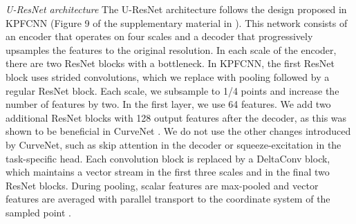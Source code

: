 \documentclass[acmtog, authorversion]{acmart}
\begin{document}
\emph{U-ResNet architecture} The U-ResNet architecture follows the design proposed in KPFCNN \cite{thomas2019KPConv} (Figure 9 of the supplementary material in \cite{thomas2019KPConv}). This network consists of an encoder that operates on four scales and a decoder that progressively upsamples the features to the original resolution. In each scale of the encoder, there are two ResNet blocks with a bottleneck. In KPFCNN, the first ResNet block uses strided convolutions, which we replace with pooling followed by a regular ResNet block. Each scale, we subsample to 1/4 points and increase the number of features by two. In the first layer, we use 64 features. We add two additional ResNet blocks with 128 output features after the decoder, as this was shown to be beneficial in CurveNet \cite{curvenet}. We do not use the other changes introduced by CurveNet, such as skip attention in the decoder or squeeze-excitation in the task-specific head. Each convolution block is replaced by a DeltaConv block, which maintains a vector stream in the first three scales and in the final two ResNet blocks. During pooling, scalar features are max-pooled and vector features are averaged with parallel transport to the coordinate system of the sampled point \cite{Wiersma2020}.
\end{document}
